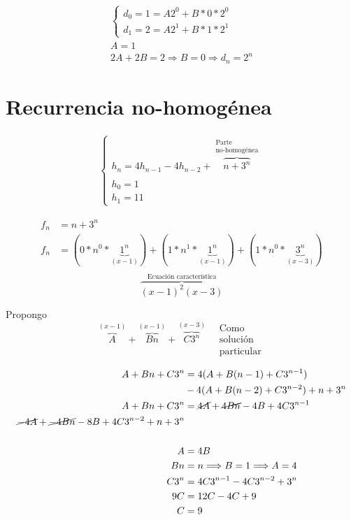 \documentclass[../main.tex]{subfiles}
\begin{document}
\begin{gather*}
	\begin{cases}
		d_0 = 1 = A2^0+B*0*2^0\\
		d_1 = 2 = A2^1+B*1*2^1
	\end{cases}\\
	A=1\\
	2A+2B=2
	\Longrightarrow
	B=0
	\Longrightarrow
	d_n=2^n
\end{gather*}

\section{Recurrencia no-homogénea}%
\label{sec:Recurrencia no-homogénea}


\begin{gather*}
	\begin{cases}
		h_n=4h_{n-1}-4h_{n-2}+
		\overbrace
		{
			n+3^n
		}^
		{
			\substack
			{
				\text{Parte}\\
				\text{no-homogénea}
			}
		}
		\\
		\\
		h_0=1\\
		h_1=11
	\end{cases}
\end{gather*}

\begin{align*}
	f_n &= n + 3^n \\
	f_n &=
	( 0*n^0*\underbrace{1^n}_{(x-1)})
	+(1*n^1*\underbrace{1^n}_{(x-1)})
	+(1*n^0*\underbrace{3^n}_{(x-3)})\\
\end{align*}
\[
	\overbrace
	{
		(x-1)^2(x-3)
	}^
	{
		\text{Ecuación característica}
	}
\]

Propongo
\[
	\boxed
	{
		\overbrace
		{
			A
		}
		^{(x-1)}
		+
		\overbrace
		{
			Bn
		}
		^{(x-1)}
		+
		\overbrace
		{
			C3^n
		}
		^{(x-3)}
	}
	\quad\substack
	{
		\text{Como}\\
		\text{solución}\\
		\text{particular}
	}
\]

\begin{align*}
	A+Bn+C3^n &=
	4(A+B(n-1)+C3^{n-1})\\
	& -4(A+B(n-2)+C3^{n-2})
	+n+3^n\\
	A+Bn+C3^n &=
	\cancel{4A}+\cancel{4Bn}-4B+4C3^{n-1}\\
	\cancel{-4A}+\cancel{-4Bn}-8B+4C3^{n-2}
	+n+3^n\\
	\\
	A&=4B\\
	Bn&=n\Longrightarrow B=1 \Longrightarrow A = 4\\
	C3^n &= 4C3^{n-1}-4C3^{n-2}+3^n\\
	9C&=12C-4C+9\\
	C&=9
\end{align*}
\end{document}
